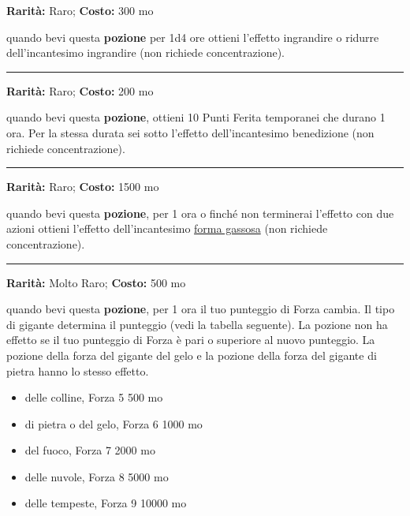 \begin{multicols}{2}
\textbf{Rarità:} Raro; \textbf{Costo:} 300 mo

quando bevi questa \textbf{pozione} per 1d4 ore ottieni l'effetto ingrandire o ridurre dell'incantesimo ingrandire (non richiede concentrazione).

\smallskip\noindent\rule{\linewidth}{2pt}  \hypertarget{PozionediEroismo}{}\medskip{}\noindent\label{PozionediEroismo}

\textbf{Rarità:} Raro; \textbf{Costo:} 200 mo

quando bevi questa \textbf{pozione}, ottieni 10 Punti Ferita temporanei che durano 1 ora. Per la stessa durata sei sotto l'effetto dell'incantesimo benedizione (non richiede concentrazione).

\smallskip\noindent\rule{\linewidth}{2pt}  \hypertarget{PozionediFormaGassosa}{}\medskip{}\noindent\label{PozionediFormaGassosa}

\textbf{Rarità:} Raro; \textbf{Costo:} 1500 mo

quando bevi questa \textbf{pozione}, per 1 ora o finché non terminerai l'effetto con due azioni ottieni l'effetto dell'incantesimo \hyperlink{PozionediFormaGassosa}{forma gassosa} (non richiede concentrazione).

\smallskip\noindent\rule{\linewidth}{2pt}  \hypertarget{PozionediForzadeiGiganti}{}\medskip{}\noindent\label{PozionediForzadeiGiganti}

\textbf{Rarità:} Molto Raro; \textbf{Costo:} 500 mo

quando bevi questa \textbf{pozione}, per 1 ora il tuo punteggio di Forza cambia. Il tipo di gigante determina il punteggio (vedi la tabella seguente). La pozione non ha effetto se il tuo punteggio di Forza è pari o superiore al nuovo punteggio. La pozione della forza del gigante del gelo e la pozione della forza del gigante di pietra hanno lo stesso effetto.

\begin{itemize} \setlength\itemsep{0em}
\item delle colline, Forza 5 500 mo
\item di pietra o del gelo, Forza 6 1000 mo
\item del fuoco, Forza 7 2000 mo
\item delle nuvole, Forza 8 5000 mo
\item delle tempeste, Forza 9 10000 mo
\end{itemize}


\end{multicols}
